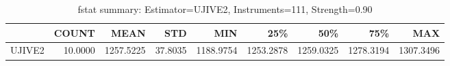 \begin{table}[ht]
\centering
\caption{fstat summary: Estimator=UJIVE2, Instruments=111, Strength=0.90}
\begin{tabular}{lrrrrrrrr}
\toprule
 & COUNT & MEAN & STD & MIN & 25\% & 50\% & 75\% & MAX \\
\midrule
UJIVE2 & 10.0000 & 1257.5225 & 37.8035 & 1188.9754 & 1253.2878 & 1259.0325 & 1278.3194 & 1307.3496 \\
\bottomrule
\end{tabular}
\end{table}
